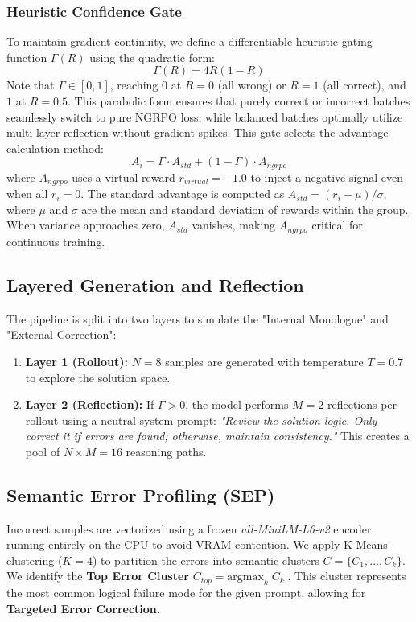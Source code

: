\documentclass[letterpaper]{article}
\begin{document}
\subsubsection{Heuristic Confidence Gate}
To maintain gradient continuity, we define a differentiable heuristic gating function $\Gamma(R)$ using the quadratic form:
\begin{equation}
\Gamma(R) = 4R(1-R)
\end{equation}
Note that $\Gamma \in [0, 1]$, reaching $0$ at $R=0$ (all wrong) or $R=1$ (all correct), and $1$ at $R=0.5$. This parabolic form ensures that purely correct or incorrect batches seamlessly switch to pure NGRPO loss, while balanced batches optimally utilize multi-layer reflection without gradient spikes. This gate selects the advantage calculation method:
\begin{equation}
A_{i} = \Gamma \cdot A_{std} + (1-\Gamma) \cdot A_{ngrpo}
\end{equation}
where $A_{ngrpo}$ uses a virtual reward $r_{virtual} = -1.0$ to inject a negative signal even when all $r_i=0$. The standard advantage is computed as $A_{std} = (r_i - \mu) / \sigma$, where $\mu$ and $\sigma$ are the mean and standard deviation of rewards within the group. When variance approaches zero, $A_{std}$ vanishes, making $A_{ngrpo}$ critical for continuous training.

\subsection{Layered Generation and Reflection}
The pipeline is split into two layers to simulate the "Internal Monologue" and "External Correction":
\begin{enumerate}
    \item \textbf{Layer 1 (Rollout):} $N=8$ samples are generated with temperature $T=0.7$ to explore the solution space.
    \item \textbf{Layer 2 (Reflection):} If $\Gamma > 0$, the model performs $M=2$ reflections per rollout using a neutral system prompt: \textit{"Review the solution logic. Only correct it if errors are found; otherwise, maintain consistency."} This creates a pool of $N \times M = 16$ reasoning paths.
\end{enumerate}

\subsection{Semantic Error Profiling (SEP)}
Incorrect samples are vectorized using a frozen \textit{all-MiniLM-L6-v2} encoder running entirely on the CPU to avoid VRAM contention. We apply K-Means clustering ($K=4$) to partition the errors into semantic clusters $C = \{C_1, \dots, C_k\}$. We identify the \textbf{Top Error Cluster} $C_{top} = \text{argmax}_k |C_k|$. This cluster represents the most common logical failure mode for the given prompt, allowing for \textbf{Targeted Error Correction}.
\end{document}
